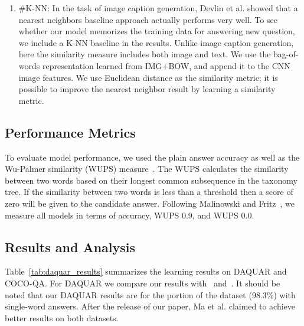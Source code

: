 \begin{enumerate}[leftmargin=*]
\item \#{K-NN}: In the task of image caption generation, Devlin et al.
\cite{devlin15} showed that a nearest neighbors baseline approach actually
performs very well. To see whether our model memorizes the training data for
answering new question, we include a K-NN baseline in the results. Unlike
image caption generation, here the similarity measure includes both image
and text.  We use the bag-of-words representation learned from IMG+BOW, and
append it to the CNN image features.  We use Euclidean distance as the
similarity metric; it is possible to improve the nearest neighbor result by 
learning a similarity metric.
\end{enumerate}


\subsection{Performance Metrics}
To evaluate model performance, we used the plain answer accuracy as well as the
Wu-Palmer similarity (WUPS) measure~\cite{wu94, malinowski14b}. The WUPS
calculates the similarity between two words based on their longest common
subsequence in the taxonomy tree. If the similarity between two words is less
than a threshold then a score of zero will be given to the candidate answer.
Following Malinowski and Fritz~\cite{malinowski14b}, we measure all models
in terms of accuracy, WUPS 0.9, and WUPS 0.0.

\subsection{Results and Analysis}
Table~\ref{tab:daquar_results} summarizes the learning results on DAQUAR
and COCO-QA. For DAQUAR
we compare our results with~\cite{malinowski14b} and~\cite{malinowski15}. It
should be noted that our DAQUAR results are for the portion of the dataset (98.3\%)
with single-word answers. After the release of our paper, Ma et al. \cite{ma15}
claimed to achieve better results on both datasets.

